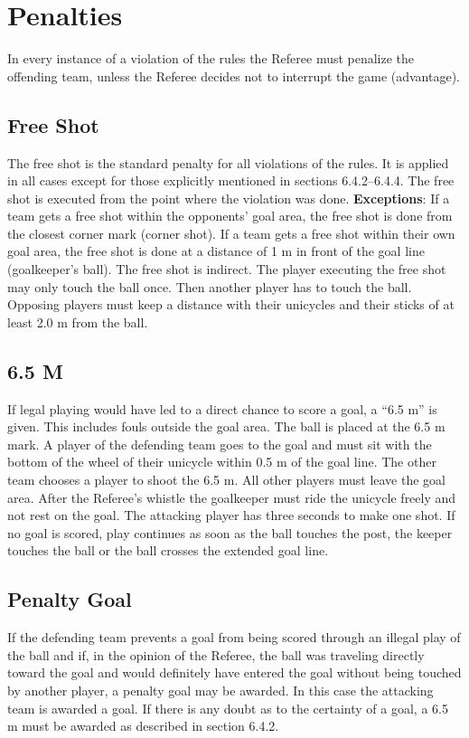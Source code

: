\section{Penalties}
In every instance of a violation of the rules the Referee must penalize the offending team, unless the Referee decides not to
interrupt the game (advantage).
\subsection{Free Shot}
The free shot is the standard penalty for all violations of the rules. It is applied in all cases except for those explicitly
mentioned in sections 6.4.2–6.4.4. The free shot is executed from the point where the violation was done. \textbf{Exceptions}:
If a team gets a free shot within the opponents’ goal area, the free shot is done from the closest corner mark (corner
shot). If a team gets a free shot within their own goal area, the free shot is done at a distance of 1 m in front of the goal
line (goalkeeper's ball). The free shot is indirect. The player executing the free shot may only touch the ball once. Then
another player has to touch the ball. Opposing players must keep a distance with their unicycles and their sticks of at
least 2.0 m from the ball.
\subsection{6.5 M}
If legal playing would have led to a direct chance to score a goal, a “6.5 m” is given. This includes fouls outside the
goal area. The ball is placed at the 6.5 m mark. A player of the defending team goes to the goal and must sit with the
bottom of the wheel of their unicycle within 0.5 m of the goal line. The other team chooses a player to shoot the 6.5 m.
All other players must leave the goal area. After the Referee’s whistle the goalkeeper must ride the unicycle freely and
not rest on the goal. The attacking player has three seconds to make one shot. If no goal is scored, play continues as
soon as the ball touches the post, the keeper touches the ball or the ball crosses the extended goal line.
\subsection{Penalty Goal}
If the defending team prevents a goal from being scored through an illegal play of the ball and if, in the opinion of the
Referee, the ball was traveling directly toward the goal and would definitely have entered the goal without being
touched by another player, a penalty goal may be awarded. In this case the attacking team is awarded a goal. If there is
any doubt as to the certainty of a goal, a 6.5 m must be awarded as described in section 6.4.2.
